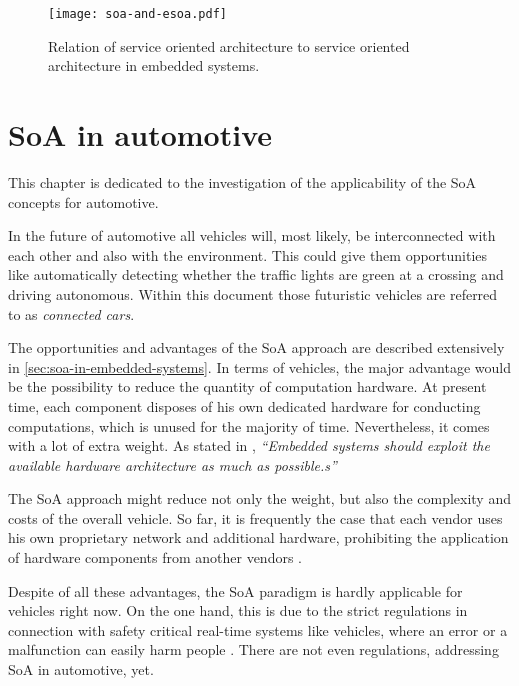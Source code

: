 \begin{figure}[ht]
\centering
\texttt{[image: soa-and-esoa.pdf]}
\caption{Relation of service oriented architecture to service oriented architecture in embedded systems.}
\label{fig:soa-and-esoa}
\end{figure}







\section{SoA in automotive}
\label{sec:soa-in-automotive}

This chapter is dedicated to the investigation of the applicability of the SoA concepts for automotive.

In the future of automotive all vehicles will, most likely, be interconnected with each other and also with the environment. This could give them opportunities like automatically detecting whether the traffic lights are green at a crossing and driving autonomous. Within this document those futuristic vehicles are referred to as \emph{connected cars}.


The opportunities and advantages of the SoA approach are described extensively in \ref{sec:soa-in-embedded-systems}. In terms of vehicles, the major advantage would be the possibility to reduce the quantity of computation hardware. At present time, each component disposes of his own dedicated hardware for conducting computations, which is unused for the majority of time. Nevertheless, it comes with a lot of extra weight. As stated in \cite[p.7]{marwedel}, \emph{``Embedded systems should exploit the available hardware architecture as much as possible.s''}

The SoA approach might reduce not only the weight, but also the complexity and costs of the overall vehicle. So far, it is frequently the case that each vendor uses his own proprietary network and additional hardware, prohibiting the application of hardware components from another vendors \cite{sommer}.

Despite of all these advantages, the SoA paradigm is hardly applicable for vehicles right now. On the one hand, this is due to the strict regulations in connection with safety critical real-time systems like vehicles, where an error or a malfunction can easily harm people \cite{kum}. There are not even regulations, addressing SoA in automotive, yet.

